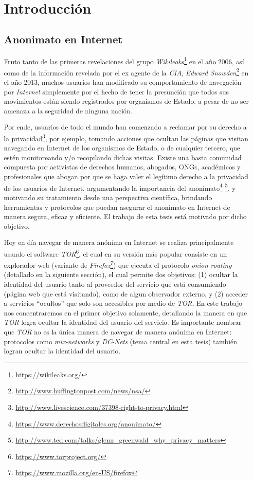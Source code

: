 \chapter{Introducción}\label{cap1}

\section{Anonimato en Internet}

Fruto tanto de las primeras revelaciones del grupo 
\emph{Wikileaks}\footnote{\url{https://wikileaks.org/}} en el año 2006, 
así como de la información revelada por el ex agente de la \emph{CIA}, 
\emph{Edward Snowden}\footnote{\url{http://www.huffingtonpost.com/news/nsa/}} 
en el año 2013, muchos usuarios han modificado su comportamiento de navegación 
por \emph{Internet} simplemente por el hecho de tener la presunción que todos 
sus movimientos están siendo registrados por organismos de Estado, a pesar de 
no ser amenaza a la seguridad de ninguna nación.

Por ende, usuarios de todo el mundo han comenzado a reclamar por su derecho a 
la privacidad\footnote{\url{http://www.livescience.com/37398-right-to-privacy.html}}, por ejemplo, tomando 
acciones que ocultan las páginas que visitan navegando en Internet de los 
organismos de Estado, o de cualquier tercero, que estén monitoreando y/o 
recopilando dichas visitas. Existe una basta comunidad compuesta por 
activistas de derechos humanos, abogados, ONGs, académicos y profesionales 
que abogan por que se haga valer el legítimo derecho a la 
privacidad de los usuarios de Internet, argumentando la importancia del 
anonimato\footnote{\url{https://www.derechosdigitales.org/anonimato/}} 
\footnote{\url{http://www.ted.com/talks/glenn_greenwald_why_privacy_matters}}, 
y motivando su tratamiento desde una perspectiva científica, brindando 
herramientas y protocolos que puedan asegurar el anonimato en Internet de 
manera segura, eficaz y eficiente. El trabajo de esta tesis está motivado por 
dicho objetivo.

Hoy en día navegar de manera anónima en Internet se realiza principalmente 
usando el software \emph{TOR}\footnote{\url{https://www.torproject.org/}}, 
el cual en su versión más popular consiste en un explorador web (variante de 
\emph{Firefox}\footnote{\url{https://www.mozilla.org/en-US/firefox}}) que 
ejecuta el protocolo \emph{onion-routing} (detallado en la siguiente sección), 
el cual permite dos objetivos: (1) ocultar la identidad del usuario tanto al 
proveedor del servicio que está consumiendo (página web que está visitando), 
como de algun observador externo, y (2) acceder a servicios ``ocultos'' que 
solo son accesibles por medio de \emph{TOR}. En este trabajo nos 
concentraremos en el primer objetivo solamente, detallando la manera en que 
\emph{TOR} logra ocultar la identidad del usuario del servicio. Es importante 
nombrar que \emph{TOR} no es la única manera de navegar de manera anónima en 
Internet: protocolos como \emph{mix-networks} y \emph{DC-Nets} (tema central 
en esta tesis) también logran ocultar la identidad del usuario.

